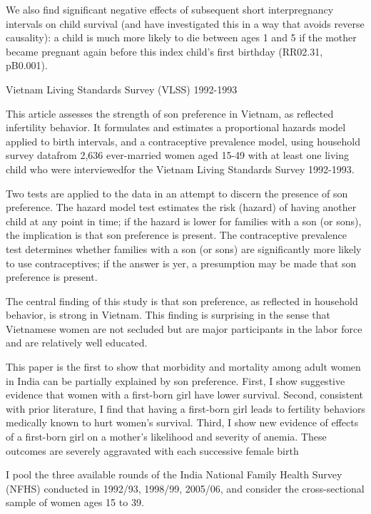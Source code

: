We also find significant negative effects of subsequent short interpregnancy intervals on child survival (and have investigated this in a way that avoids reverse causality): a child is much more likely to die between ages 1 and 5 if the mother became pregnant again before this index child’s first birthday (RR02.31, pB0.001).

\citep{Haughton1995}

Vietnam Living Standards Survey (VLSS) 1992-1993

This article assesses the strength of son preference in Vietnam, as reflected infertility behavior. It
formulates and estimates a proportional hazards model applied to birth intervals, and a contraceptive
prevalence model, using household survey datafrom 2,636 ever-married women aged 15-49 with at
least one living child who were interviewedfor the Vietnam Living Standards Survey 1992-1993.

 Two tests are applied to the data in an attempt to discern the presence of son preference. The hazard
model test estimates the risk (hazard) of having another
child at any point in time; if the hazard is lower for families with a son (or sons),
the implication is that son preference is present. The contraceptive prevalence test
determines whether families with a son (or sons) are significantly more likely to use
contraceptives; if the answer is yer, a presumption may be made that son preference is present.

The central finding of this study is that son preference,
as reflected in household behavior, is strong in Vietnam.
This finding is surprising in the sense that Vietnamese
women are not secluded but are major participants in
the labor force and are relatively well educated.

\citep{Milazzo2018}

This paper is the ﬁrst to show that morbidity and mortality among adult women in India can be partially explained by son preference. First, I show suggestive evidence that women with a ﬁrst-born girl have lower survival. Second, consistent with prior literature, I ﬁnd that having a ﬁrst-born girl leads to fertility behaviors medically known to hurt women’s survival. Third, I show new evidence of eﬀects of a ﬁrst-born girl on a mother’s likelihood and severity of anemia. These outcomes are severely aggravated with each successive female birth

I pool the three available rounds of the India National Family Health Survey (NFHS) conducted in 1992/93, 1998/99, 2005/06, and consider the cross-sectional sample of women ages 15 to 39.

